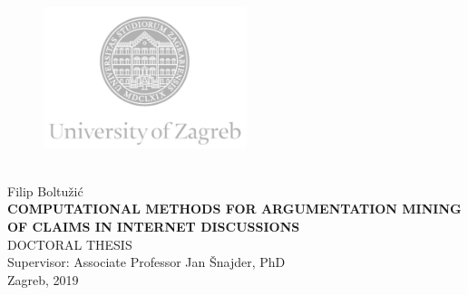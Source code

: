 \begin{titlepage}
  \fontsize{16pt}{20pt}\selectfont
  \selectfont
  \setlength{\intextsep}{0pt plus 0pt minus 0pt}

  \begin{center}
    \begin{figure}[ht!]
      \begin{center}
        \includegraphics[height=4.1184cm, width=5.94cm]{logo_unizg_eng}
      \end{center}
    \end{figure}		
    \vspace{0cm}
    {} \\
    \vspace{3cm}
    Filip Boltužić \\
    \vspace{2cm}
    {\fontsize{22pt}{22pt}\selectfont\textbf{
COMPUTATIONAL METHODS FOR ARGUMENTATION MINING OF CLAIMS IN INTERNET DISCUSSIONS}} \\
    \vspace{2cm}   
    DOCTORAL THESIS \\  
    \vspace{5cm}   %
    Supervisor: Associate Professor Jan Šnajder, PhD \\
    \vfill{Zagreb, 2019}
  \end{center}
  \restoregeometry
\end{titlepage}

